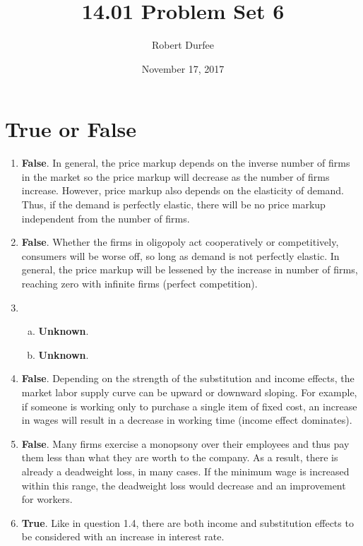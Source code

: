 \documentclass{article}
\title{ 14.01 Problem Set 6 }
\author{ Robert Durfee }
\date{ November 17, 2017 }
\begin{document}
\maketitle

\section{ True or False }

\begin{enumerate}
    \item \textbf{False}. In general, the price markup depends on the inverse
        number of firms in the market so the price markup will decrease as the
        number of firms increase. However, price markup also depends on the
        elasticity of demand. Thus, if the demand is perfectly elastic, there
        will be no price markup independent from the number of firms.
    \item \textbf{False}. Whether the firms in oligopoly act cooperatively or
        competitively, consumers will be worse off, so long as demand is not
        perfectly elastic. In general, the price markup will be lessened by the
        increase in number of firms, reaching zero with infinite firms (perfect
        competition).     
    \item 
        \begin{enumerate}[a.]
            \item \textbf{Unknown}. 
            \item \textbf{Unknown}.
        \end{enumerate}
    \item \textbf{False}. Depending on the strength of the substitution and
        income effects, the market labor supply curve can be upward or downward
        sloping. For example, if someone is working only to purchase a single
        item of fixed cost, an increase in wages will result in a decrease in
        working time (income effect dominates).
    \item \textbf{False}. Many firms exercise a monopsony over their employees
        and thus pay them less than what they are worth to the company. As a
        result, there is already a deadweight loss, in many cases. If the
        minimum wage is increased within this range, the deadweight loss would
        decrease and an improvement for workers.
    \item \textbf{True}. Like in question 1.4, there are both income and
        substitution effects to be considered with an increase in interest
        rate. 
\end{enumerate}
\end{document}
